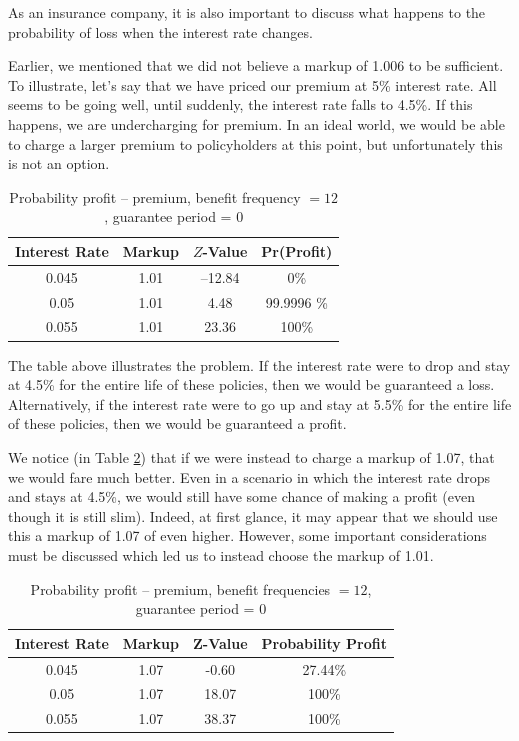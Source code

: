 \documentclass[12pt]{article}
\begin{document}
As an insurance company, it is also important to discuss what happens to the probability of loss when the interest rate changes. 

Earlier, we mentioned that we did not believe a markup of 1.006 to be sufficient. To illustrate, let's say that we have priced our premium at 5\% interest rate. All seems to be going well, until suddenly, the interest rate falls to 4.5\%. If this happens, we are undercharging for premium. In an ideal world, we would be able to charge a larger premium to policyholders at this point, but unfortunately this is not an option.

\begin{table}[!ht] 
\centering 
\begin{tabular}{c c c c }
\hline
Interest Rate & Markup & $Z$-Value & Pr(Profit) \\ [0.5ex]
\hline  
0.045 & 1.01 & --12.84 & 0\% \\
0.05 & 1.01 & 4.48 & 99.9996 \% \\
0.055 & 1.01 & 23.36 & 100\% \\
\hline  
\end{tabular} 
\caption{Probability profit -- premium, benefit frequency $= 12$, guarantee period = 0}  
\label{table:grosspremiums} 
\end{table}

The table above illustrates the problem. If the interest rate were to drop and stay at 4.5\% for the entire life of these policies, then we would be guaranteed a loss. Alternatively, if the interest rate were to go up and stay at 5.5\% for the entire life of these policies, then we would be guaranteed a profit.

We notice (in Table \ref{table:grosspremiums2}) that if we were instead to charge a markup of 1.07, that we would fare much better. Even in a scenario in which the interest rate drops and stays at 4.5\%, we would still have some chance of making a profit (even though it is still slim). Indeed, at first glance, it may appear that we should use this a markup of 1.07 of even higher. However, some important considerations must be discussed which led us to instead choose the markup of 1.01.

\begin{table}[!ht] 
\centering 
\begin{tabular}{c c c c }
\hline
Interest Rate & Markup & Z-Value & Probability Profit \\ [0.5ex]
\hline  
0.045 & 1.07 & -0.60 & 27.44\% \\
0.05 & 1.07 & 18.07 & 100\% \\
0.055 & 1.07 & 38.37 & 100\% \\
\hline  
\end{tabular} 
\caption{Probability profit -- premium, benefit frequencies $=12$, guarantee period = 0}  
\label{table:grosspremiums2} 
\end{table} 
\end{document}
